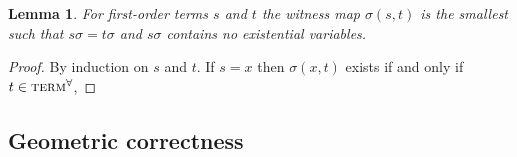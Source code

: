\documentclass{article}
\theoremstyle{definition}
\theoremstyle{plain}
\newtheorem{lemma}[definition]{Lemma}
\newcommand\termsA{\textsc{term}^\forall}
\newcommand\+{+}
\renewcommand\*{\times}
\newcommand\ubot\sqcup
\begin{document}
\begin{lemma}
\label{lem:minimal witness map}
For first-order terms $s$ and $t$ the witness map $\sigma(s,t)$ is the smallest such that $s\sigma=t\sigma$ and $s\sigma$ contains no existential variables.
\end{lemma}

\begin{proof}
By induction on $s$ and $t$. If $s=x$ then $\sigma(x,t)$ exists if and only if $t\in\termsA$, 
\end{proof}

%


\subsection{Geometric correctness}
\end{document}
